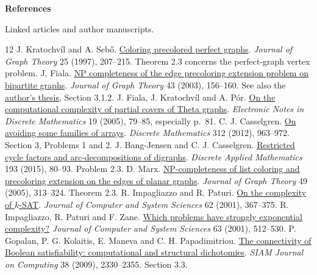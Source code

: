 \documentclass[12pt,letterpaper]{article}
\newcommand{\rref}[2]{\href{#1}{#2}}
\begin{document}
\newpage
\endgroup
{}
{\LARGE\bfseries\color{ink} References\par}
{\small Linked articles and author manuscripts.}\par
\begingroup\small
\renewcommand{\refname}{}
\vspace{-1.0em}
\begin{thebibliography}{12}\setlength{\itemsep}{4.5pt}\setlength{\parskip}{0pt}
 J. Kratochv\'il and A. Seb\H{o}. \rref{https://pagesperso.g-scop.grenoble-inp.fr/~seboa/sebo_files/papers/jgt97prext.pdf}{Coloring precolored perfect graphs}. \emph{Journal of Graph Theory} 25 (1997), 207--215. Theorem 2.3 concerns the perfect-graph vertex problem.
 J. Fiala. \rref{https://doi.org/10.1002/jgt.10088}{NP completeness of the edge precoloring extension problem on bipartite graphs}. \emph{Journal of Graph Theory} 43 (2003), 156--160. See also the \rref{https://kam.mff.cuni.cz/~fiala/papers/dis.pdf}{author's thesis}, Section 3.1.2.
 J. Fiala, J. Kratochv\'il and A. P\'or. \rref{https://doi.org/10.1016/j.endm.2005.05.012}{On the computational complexity of partial covers of Theta graphs}. \emph{Electronic Notes in Discrete Mathematics} 19 (2005), 79--85, especially p.~81.
 C. J. Casselgren. \rref{https://doi.org/10.1016/j.disc.2011.10.028}{On avoiding some families of arrays}. \emph{Discrete Mathematics} 312 (2012), 963--972. Section 3, Problems 1 and 2.
 J. Bang-Jensen and C. J. Casselgren. \rref{https://doi.org/10.1016/j.dam.2015.04.020}{Restricted cycle factors and arc-decompositions of digraphs}. \emph{Discrete Applied Mathematics} 193 (2015), 80--93. Problem 2.3.
 D. Marx. \rref{https://www.cs.bme.hu/~dmarx/papers/planar-edge-prext.pdf}{NP-completeness of list coloring and precoloring extension on the edges of planar graphs}. \emph{Journal of Graph Theory} 49 (2005), 313--324. Theorem 2.3.
 R. Impagliazzo and R. Paturi. \rref{https://doi.org/10.1006/jcss.2000.1727}{On the complexity of \(k\)-SAT}. \emph{Journal of Computer and System Sciences} 62 (2001), 367--375.
 R. Impagliazzo, R. Paturi and F. Zane. \rref{https://cseweb.ucsd.edu/~paturi/myPapers/pubs/ImpagliazzoPaturiZane_2001_jcss.pdf}{Which problems have strongly exponential complexity?} \emph{Journal of Computer and System Sciences} 63 (2001), 512--530.
 P. Gopalan, P. G. Kolaitis, E. Maneva and C. H. Papadimitriou. \rref{https://doi.org/10.1137/07070440X}{The connectivity of Boolean satisfiability: computational and structural dichotomies}. \emph{SIAM Journal on Computing} 38 (2009), 2330--2355. Section 3.3.

\end{thebibliography}
\end{document}
